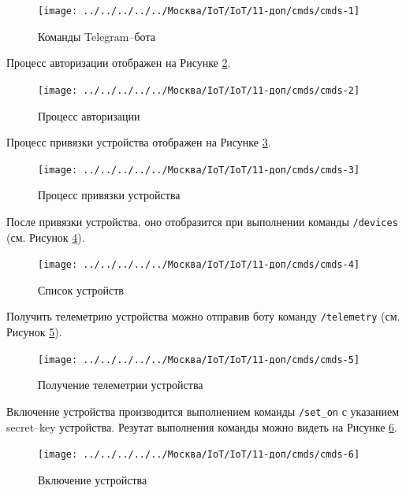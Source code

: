 \documentclass[a4paper,14pt]{extarticle}
\begin{document}
\begin{figure}[h!]
	\centering
	\texttt{[image: ../../../../../Москва/IoT/IoT/11-доп/cmds/cmds-1]}
	\caption{Команды Telegram--бота}
	\label{fig:cmds-1}
\end{figure}

Процесс авторизации отображен на Рисунке \ref{fig:cmds-2}.
\begin{figure}[h!]
	\centering
	\texttt{[image: ../../../../../Москва/IoT/IoT/11-доп/cmds/cmds-2]}
	\caption{Процесс авторизации}
	\label{fig:cmds-2}
\end{figure}

Процесс привязки устройства отображен на Рисунке \ref{fig:cmds-3}.
\begin{figure}[h!]
	\centering
	\texttt{[image: ../../../../../Москва/IoT/IoT/11-доп/cmds/cmds-3]}
	\caption{Процесс привязки устройства}
	\label{fig:cmds-3}
\end{figure}

После привязки устройства, оно отобразится при выполнении команды \texttt{/devices} (см. Рисунок \ref{fig:cmds-4}).

\begin{figure}[h!]
	\centering
	\texttt{[image: ../../../../../Москва/IoT/IoT/11-доп/cmds/cmds-4]}
	\caption{Список устройств}
	\label{fig:cmds-4}
\end{figure}

Получить телеметрию устройства можно отправив боту команду \texttt{/telemetry} (см. Рисунок \ref{fig:cmds-5}).

\begin{figure}[h!]
	\centering
	\texttt{[image: ../../../../../Москва/IoT/IoT/11-доп/cmds/cmds-5]}
	\caption{Получение телеметрии устройства}
	\label{fig:cmds-5}
\end{figure}


Включение устройства производится выполнением команды \texttt{/set\_on} с указанием \mbox{secret--key} устройства. Резутат выполнения команды можно видеть на Рисунке \ref{fig:cmds-6}.

\begin{figure}[h!]
	\centering
	\texttt{[image: ../../../../../Москва/IoT/IoT/11-доп/cmds/cmds-6]}
	\caption{Включение устройства}
	\label{fig:cmds-6}
\end{figure}
\end{document}
